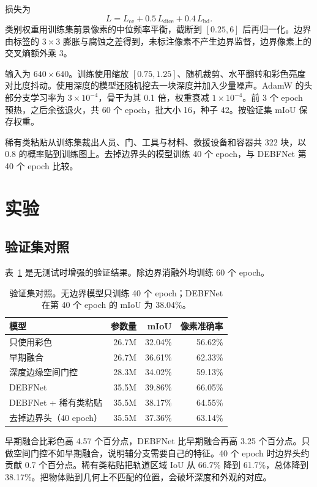 \documentclass[11pt]{article}
\begin{document}
损失为
\[
L = L_{\mathrm{ce}} + 0.5\,L_{\mathrm{dice}} + 0.4\,L_{\mathrm{bd}}.
\]
类别权重用训练集前景像素的中位频率平衡，截断到 $[0.25,6]$ 后再归一化。边界由标签的 $3\times3$ 膨胀与腐蚀之差得到，未标注像素不产生边界监督，边界像素上的交叉熵额外乘 3。

输入为 $640\times640$。训练使用缩放 $[0.75,1.25]$、随机裁剪、水平翻转和彩色亮度对比度抖动。使用深度的模型还随机挖去一块深度并加入少量噪声。AdamW 的头部分支学习率为 $3\times10^{-4}$，骨干为其 0.1 倍，权重衰减 $1\times10^{-4}$。前 3 个 epoch 预热，之后余弦退火，共 60 个 epoch，批大小 16，种子 42。按验证集 mIoU 保存权重。

稀有类粘贴从训练集裁出人员、门、工具与材料、救援设备和容器共 322 块，以 0.8 的概率贴到训练图上。去掉边界头的模型训练 40 个 epoch，与 DEBFNet 第 40 个 epoch 比较。

\section{实验}

\subsection{验证集对照}

表~\ref{tab:main} 是无测试时增强的验证结果。除边界消融外均训练 60 个 epoch。

\begin{table}[ht]
\centering
\caption{验证集对照。无边界模型只训练 40 个 epoch；DEBFNet 在第 40 个 epoch 的 mIoU 为 38.04\%。}
\label{tab:main}
\begin{tabular}{lrrr}
\toprule
模型 & 参数量 & mIoU & 像素准确率 \\
\midrule
只使用彩色 & 26.7M & 32.04\% & 56.62\% \\
早期融合 & 26.7M & 36.61\% & 62.33\% \\
深度边缘空间门控 & 28.3M & 34.02\% & 59.13\% \\
DEBFNet & 35.5M & 39.86\% & 66.05\% \\
DEBFNet + 稀有类粘贴 & 35.5M & 38.17\% & 64.55\% \\
去掉边界头（40 epoch） & 35.5M & 37.36\% & 63.14\% \\
\bottomrule
\end{tabular}
\end{table}

早期融合比彩色高 4.57 个百分点，DEBFNet 比早期融合再高 3.25 个百分点。只做空间门控不如早期融合，说明辅分支需要自己的特征。40 个 epoch 时边界头约贡献 0.7 个百分点。稀有类粘贴把轨道区域 IoU 从 66.7\% 降到 61.7\%，总体降到 38.17\%。把物体贴到几何上不匹配的位置，会破坏深度和外观的对应。
\end{document}
